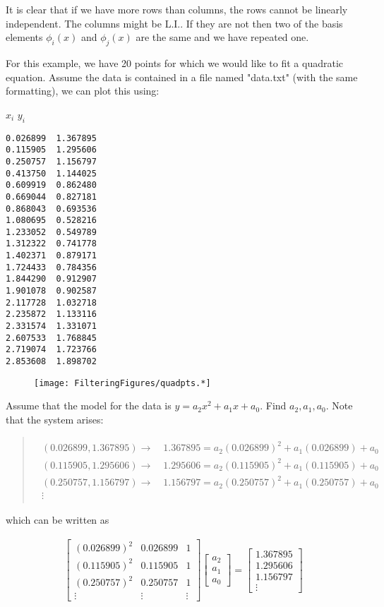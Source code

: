 It is clear that if we have more rows than columns, the rows cannot be
linearly independent. The columns might be L.I.. If they are not then
two of the basis elements \(\phi_i(x)\) and \(\phi_j(x)\) are the same
and we have repeated one.

For this example, we have 20 points for which we would like to fit a
quadratic equation. Assume the data is contained in a file named
"data.txt" (with the same formatting), we can plot this using:

\(x_i\) \(y_i\)

\begin{verbatim}
0.026899  1.367895
0.115905  1.295606
0.250757  1.156797
0.413750  1.144025
0.609919  0.862480
0.669044  0.827181
0.868043  0.693536
1.080695  0.528216
1.233052  0.549789
1.312322  0.741778
1.402371  0.879171
1.724433  0.784356
1.844290  0.912907
1.901078  0.902587
2.117728  1.032718
2.235872  1.133116
2.331574  1.331071
2.607533  1.768845
2.719074  1.723766
2.853608  1.898702
\end{verbatim}

\begin{figure}
\centering
\texttt{[image: FilteringFigures/quadpts.*]}
\caption{}
\end{figure}

Assume that the model for the data is \(y = a_2x^2 + a_1x +a_0\). Find
\(a_2, a_1, a_0\). Note that the system arises:

\begin{quote}
\[\begin{aligned}
\begin{array}{c}
   (0.026899, 1.367895) \to\quad 1.367895 = a_2(0.026899)^2 + a_1(0.026899) + a_0\\
   (0.115905,  1.295606) \to\quad  1.295606 = a_2(0.115905)^2 + a_1(0.115905) + a_0\\
    (0.250757, 1.156797) \to\quad   1.156797 = a_2(0.250757)^2 + a_1(0.250757) + a_0\\
   \vdots
  \end{array}
\end{aligned}\]
\end{quote}

which can be written as

\[\begin{aligned}
\begin{bmatrix}
(0.026899)^2 & 0.026899 & 1\\
(0.115905)^2 & 0.115905 & 1\\
(0.250757)^2 & 0.250757 & 1\\
\vdots & \vdots & \vdots
\end{bmatrix}
\begin{bmatrix}
 a_2 \\ a_1 \\ a_0
\end{bmatrix}
=
\begin{bmatrix}
 1.367895\\
  1.295606\\
 1.156797\\
\vdots
\end{bmatrix}
\end{aligned}\]

